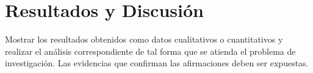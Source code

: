 \chapter{Resultados y Discusión}

Mostrar los resultados obtenidos como datos cualitativos o cuantitativos y realizar el análisis correspondiente de tal forma que se atienda el problema de investigación. Las evidencias que confirman las afirmaciones deben ser expuestas.\cite{einstein}